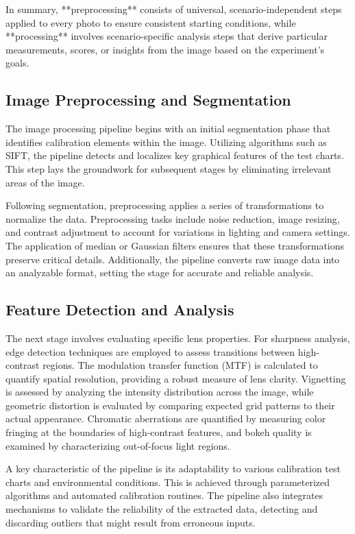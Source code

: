 In summary, **preprocessing** consists of universal, scenario-independent steps applied to every photo to ensure consistent starting conditions, while **processing** involves scenario-specific analysis steps that derive particular measurements, scores, or insights from the image based on the experiment’s goals.

\subsection{Image Preprocessing and Segmentation}

The image processing pipeline begins with an initial segmentation phase that identifies calibration elements within the image. Utilizing algorithms such as SIFT, the pipeline detects and localizes key graphical features of the test charts. This step lays the groundwork for subsequent stages by eliminating irrelevant areas of the image.

Following segmentation, preprocessing applies a series of transformations to normalize the data. Preprocessing tasks include noise reduction, image resizing, and contrast adjustment to account for variations in lighting and camera settings. The application of median or Gaussian filters ensures that these transformations preserve critical details. Additionally, the pipeline converts raw image data into an analyzable format, setting the stage for accurate and reliable analysis.

\subsection{Feature Detection and Analysis}

The next stage involves evaluating specific lens properties. For sharpness analysis, edge detection techniques are employed to assess transitions between high-contrast regions. The modulation transfer function (MTF) is calculated to quantify spatial resolution, providing a robust measure of lens clarity. Vignetting is assessed by analyzing the intensity distribution across the image, while geometric distortion is evaluated by comparing expected grid patterns to their actual appearance. Chromatic aberrations are quantified by measuring color fringing at the boundaries of high-contrast features, and bokeh quality is examined by characterizing out-of-focus light regions.

A key characteristic of the pipeline is its adaptability to various calibration test charts and environmental conditions. This is achieved through parameterized algorithms and automated calibration routines. The pipeline also integrates mechanisms to validate the reliability of the extracted data, detecting and discarding outliers that might result from erroneous inputs.


